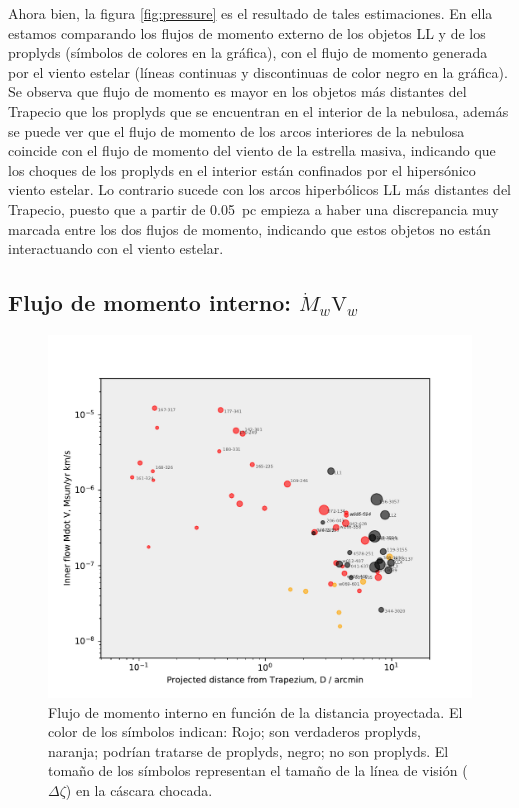 Ahora bien, la figura \ref{fig:pressure} es el resultado de tales estimaciones. En ella estamos comparando los flujos de momento externo de los objetos LL y de los proplyds (símbolos de colores en la gráfica), con el flujo de momento generada por el viento estelar (líneas continuas  y discontinuas  de color  negro en la gráfica). Se observa que flujo de momento es mayor en los objetos más distantes del Trapecio que los proplyds que se encuentran en el interior de la nebulosa, además se puede ver que el flujo de momento de los arcos interiores de la nebulosa coincide con el flujo de momento del viento de la estrella masiva, indicando que los choques de los proplyds en el interior están confinados por el hipersónico viento estelar. Lo contrario sucede con los arcos hiperbólicos LL más distantes del Trapecio, puesto que a partir de 0.05~pc empieza a haber una discrepancia muy marcada entre los dos flujos de momento, indicando que estos objetos no están interactuando con el viento estelar.  

\subsection{Flujo de momento interno: \(\dot{M}_{w}\text{V}_{w}\) }
\label{sec:momentum}

\begin{figure}
  \centering
  \includegraphics[width=\linewidth, clip]{luis-programas/will-MdotV-vs-D.pdf}
  \caption{Flujo de momento interno  en función de la distancia proyectada. El color de los símbolos indican: Rojo; son verdaderos proplyds, naranja; podrían tratarse de proplyds, negro; no son proplyds. El tomaño de los símbolos representan el tamaño de la línea de visión (\(\Delta\zeta\)) en la cáscara chocada.  }
 \label{fig:flow}
\end{figure}


